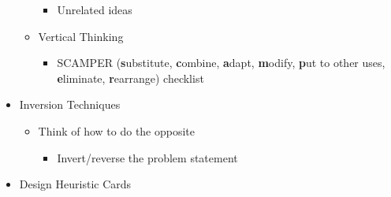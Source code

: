 \begin{itemize}
\begin{itemize}
\begin{itemize}
          \item Unrelated ideas

        \end{itemize}

      \item Vertical Thinking

        \begin{itemize}

          \item SCAMPER (\textbf{s}ubstitute, \textbf{c}ombine, \textbf{a}dapt, \textbf{m}odify, \textbf{p}ut to other uses, \textbf{e}liminate, \textbf{r}earrange) checklist

        \end{itemize}

    \end{itemize}

  \item Inversion Techniques

    \begin{itemize}

      \item Think of how to do the opposite

        \begin{itemize}

          \item Invert/reverse the problem statement

        \end{itemize}

    \end{itemize}

  \item Design Heuristic Cards

\end{itemize}




